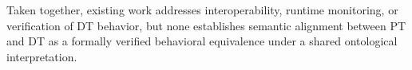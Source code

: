 Taken together, existing work addresses interoperability, runtime monitoring, or verification of DT behavior, but none establishes semantic alignment between PT and DT as a formally verified behavioral equivalence under a shared ontological interpretation.




